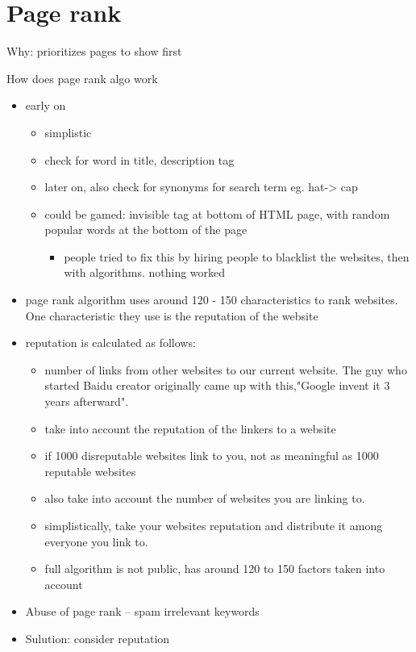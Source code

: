 \documentclass[fancy,11pt,titlestyle=display]{style/elegantbook}
\begin{document}

\section{Page rank} 

Why: prioritizes pages to show first 

How does page rank algo work
\begin{itemize}
    \item early on
    \begin{itemize}
        \item simplistic
        \item check for word in title, description tag
        \item later on, also check for synonyms for search term eg. hat-> cap
        \item could be gamed: invisible tag at bottom of HTML page, with random popular words at the bottom of the page
        \begin{itemize}
            \item people tried to fix this by hiring people to blacklist the websites, then with algorithms. nothing worked
        \end{itemize}
    \end{itemize}

    \item page rank algorithm uses around 120 - 150 characteristics to rank websites. One characteristic they use is the reputation of the website
    \item reputation is calculated as follows:
    \begin{itemize}
        \item number of links from other websites to our current website. The guy who started Baidu creator originally came up with this,"Google invent it 3 years afterward".
        \item take into account the reputation of the linkers to a website
        \item if 1000 disreputable websites link to you, not as meaningful as 1000 reputable websites
        \item also take into account the number of websites you are linking to. 
        \item simplistically, take your websites reputation and distribute it among everyone you link to.
        \item full algorithm is not public, has around 120 to 150 factors taken into account
    \end{itemize}
    \item Abuse of page rank – spam irrelevant keywords \item Sulution: consider reputation
\end{itemize}
\end{document}
